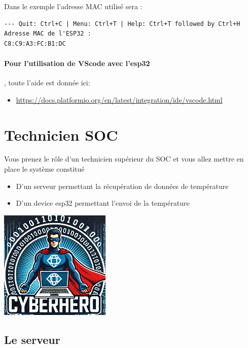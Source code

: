 \documentclass[french, 12pt]{article}%
\newcommand{\itemE}{\item[$\bullet$]}
\begin{document}
Dans le exemple l'adresse MAC utilisé sera : 
\begin{lstlisting}[style=commande]
--- Quit: Ctrl+C | Menu: Ctrl+T | Help: Ctrl+T followed by Ctrl+H
Adresse MAC de l'ESP32 :
C8:C9:A3:FC:B1:DC
\end{lstlisting}

\paragraph{Pour l'utilisation de VScode avec l'esp32}, toute l'aide est donnée ici: 
\begin{itemize}
\itemE \href{https://docs.platformio.org/en/latest/integration/ide/vscode.html}{https://docs.platformio.org/en/latest/integration/ide/vscode.html}
\end{itemize}

\newpage
\section{Technicien SOC}

Vous prenez le rôle d'un technicien supérieur du SOC et vous allez mettre en place le système constitué 


\begin{minipage}{0.55\linewidth}
\begin{itemize}
\itemE D'un serveur permettant la récupération de données de température
\itemE D'un device esp32 permettant l'envoi de la température
\end{itemize}
\end{minipage}
\begin{minipage}{0.44\linewidth}
\begin{center}
\includegraphics[scale=0.7]{./ressource/cyberHro.png}
\end{center}
\end{minipage}

\subsection{Le serveur}
\end{document}
